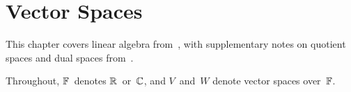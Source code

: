 %
%
%
\chapter{Vector Spaces}
This chapter covers linear algebra from~\cite{axler97}, with supplementary notes on quotient spaces and dual spaces from~\cite{friedberg03}.

Throughout, \(\mathbb{F}\)~denotes \(\mathbb{R}\)~or~\(\mathbb{C}\), and \(V\)~and~\(W\) denote vector spaces over~\(\mathbb{F}\).











